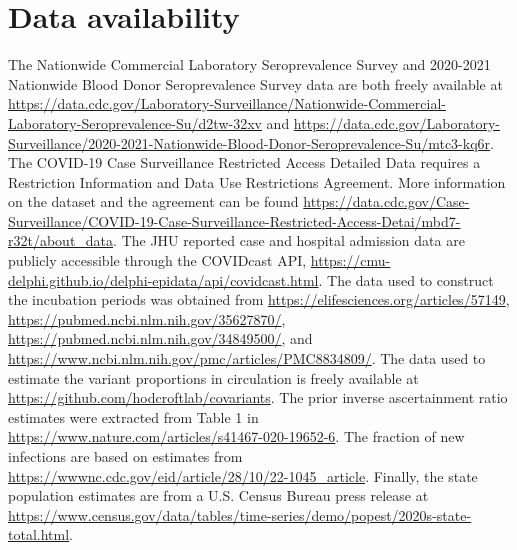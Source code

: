 \documentclass{article}
\begin{document}









\section*{Data availability}
The Nationwide Commercial Laboratory Seroprevalence Survey 
and 2020-2021 Nationwide Blood Donor Seroprevalence Survey 
data are both freely available at
\href{https://data.cdc.gov/Laboratory-Surveillance/Nationwide-Commercial-Laboratory-Seroprevalence-Su/d2tw-32xv}{https://data.cdc.gov/Laboratory-Surveillance/Nationwide-Commercial-Laboratory-Seroprevalence-Su/d2tw-32xv} 
and 
\href{https://data.cdc.gov/Laboratory-Surveillance/2020-2021-Nationwide-Blood-Donor-Seroprevalence-Su/mtc3-kq6r}{https://data.cdc.gov/Laboratory-Surveillance/2020-2021-Nationwide-Blood-Donor-Seroprevalence-Su/mtc3-kq6r}. 
The COVID-19 Case Surveillance Restricted Access Detailed Data 
requires a Restriction Information and Data Use Restrictions 
Agreement. More information on the dataset and the agreement 
can be found \href{https://data.cdc.gov/Case-Surveillance/COVID-19-Case-Surveillance-Restricted-Access-Detai/mbd7-r32t/about\_data}{https://data.cdc.gov/Case-Surveillance/COVID-19-Case-Surveillance-Restricted-Access-Detai/mbd7-r32t/about\_data}. 
The JHU reported case and hospital admission data are 
publicly accessible through the COVIDcast API, 
\href{https://cmu-delphi.github.io/delphi-epidata/api/covidcast.html}{https://cmu-delphi.github.io/delphi-epidata/api/covidcast.html}. 
The data used to construct the incubation periods was obtained from \newline
\href{https://elifesciences.org/articles/57149}{https://elifesciences.org/articles/57149}, 
\href{https://pubmed.ncbi.nlm.nih.gov/35627870/}{https://pubmed.ncbi.nlm.nih.gov/35627870/}, \newline
\href{https://pubmed.ncbi.nlm.nih.gov/34849500/}{https://pubmed.ncbi.nlm.nih.gov/34849500/}, 
and \href{https://www.ncbi.nlm.nih.gov/pmc/articles/PMC8834809/}{https://www.ncbi.nlm.nih.gov/pmc/articles/PMC8834809/}. 
The data used to estimate the variant proportions in circulation is freely 
available at \newline \href{https://github.com/hodcroftlab/covariants}{https://github.com/hodcroftlab/covariants}. 
The prior inverse ascertainment ratio estimates were extracted from Table 1 in
 \href{https://www.nature.com/articles/s41467-020-19652-6}{https://www.nature.com/articles/s41467-020-19652-6}. 
 The fraction of new infections are based on estimates from \href{https://wwwnc.cdc.gov/eid/article/28/10/22-1045\_article}{https://wwwnc.cdc.gov/eid/article/28/10/22-1045\_article}. 
Finally, the state population estimates are from a U.S. Census Bureau press release at \href{https://www.census.gov/data/tables/time-series/demo/popest/2020s-state-total.html}{https://www.census.gov/data/tables/time-series/demo/popest/2020s-state-total.html}.
\end{document}
